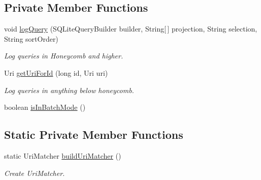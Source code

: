 \subsection*{Private Member Functions}
\begin{DoxyCompactItemize}
\item 
void \hyperlink{classuk_1_1ac_1_1swan_1_1digitaltrails_1_1database_1_1_white_rock_content_provider_aab17572cc338694e91e0052e65e3883b}{log\+Query} (S\+Q\+Lite\+Query\+Builder builder, String\mbox{[}$\,$\mbox{]} projection, String selection, String sort\+Order)
\begin{DoxyCompactList}\small\item\em Log queries in Honeycomb and higher. \end{DoxyCompactList}\item 
Uri \hyperlink{classuk_1_1ac_1_1swan_1_1digitaltrails_1_1database_1_1_white_rock_content_provider_abac163f5ac9b99878de796e5ccba7bbf}{get\+Uri\+For\+Id} (long id, Uri uri)
\begin{DoxyCompactList}\small\item\em Log queries in anything below honeycomb. \end{DoxyCompactList}\item 
boolean \hyperlink{classuk_1_1ac_1_1swan_1_1digitaltrails_1_1database_1_1_white_rock_content_provider_aabe3f5a30aba3a8f738adde614c06acf}{is\+In\+Batch\+Mode} ()
\end{DoxyCompactItemize}
\subsection*{Static Private Member Functions}
\begin{DoxyCompactItemize}
\item 
static Uri\+Matcher \hyperlink{classuk_1_1ac_1_1swan_1_1digitaltrails_1_1database_1_1_white_rock_content_provider_afd9d77e8923413814d030dd003de4694}{build\+Uri\+Matcher} ()
\begin{DoxyCompactList}\small\item\em Create Uri\+Matcher. \end{DoxyCompactList}\end{DoxyCompactItemize}
